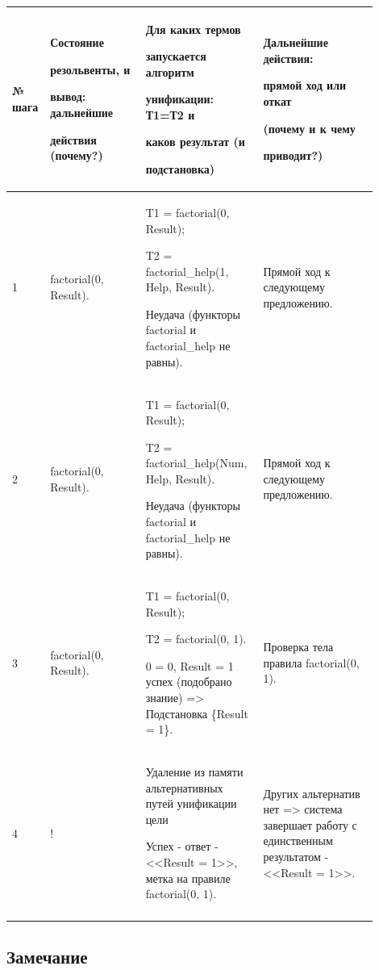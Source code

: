 \documentclass[a4paper,12pt]{article}
\begin{document}
	\begin{center}
		\begin{longtable}[h!]{|p{0.05\linewidth}|p{0.25\linewidth}|p{ 0.3\linewidth}|p{ 0.3\linewidth}|}
			\hline
			{№ шага} & {Состояние 
				
				резольвенты, и 
				
				вывод: дальнейшие 
				
				действия (почему?)} & {Для каких термов 
				
				запускается алгоритм 
				
				унификации: Т1=Т2 и 
				
				каков {\bf результат} (и 
				
				подстановка)} & {Дальнейшие действия: 
				
				прямой ход или откат 
				
				(почему и к чему 
				
				приводит?)}\\
			\hline
			{1} & {factorial(0, Result).} & {T1 = factorial(0, Result);
				
				T2 = factorial\_help(1, Help, Result).
				
				Неудача (функторы factorial и factorial\_help не равны).} & {Прямой ход к следующему предложению.}\\
			\hline
			{2} & {factorial(0, Result).} & {T1 = factorial(0, Result);
				
				T2 = factorial\_help(Num, Help, Result).
				
				Неудача (функторы factorial и factorial\_help не равны).} & {Прямой ход к следующему предложению.}\\
			\hline
			{3} & {factorial(0, Result).} & {T1 = factorial(0, Result);
				
				T2 = factorial(0, 1).
				
				0 = 0, Result = 1 успех (подобрано знание) => Подстановка \{Result = 1\}.} & {Проверка тела правила factorial(0, 1).}\\
			\hline
			{4} & {!} & {Удаление из памяти альтернативных путей унификации цели
				
				Успех - ответ - <<Result = 1>>, метка на правиле factorial(0, 1).} & {Других альтернатив нет => система завершает работу с единственным результатом - <<Result = 1>>.}\\
			\hline
			\label{m2}
		\end{longtable}
	\end{center}

	\subsection*{Замечание}
	
\end{document}
